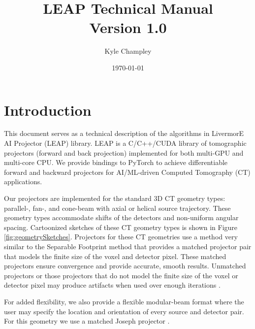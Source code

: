 \documentclass[11pt]{article}
\title{LEAP Technical Manual \\ Version 1.0}
\author{Kyle Champley}
\date{\today}
\begin{document}
\newcommand{\B}[1]{\textbf{#1}}
\newcommand{\ra}{\rightarrow}
\newcommand{\sinc}{\text{sinc}}
\newcommand{\supp}{\text{supp}}
\newcommand{\suppe}{\text{supp}_{\varepsilon}}
\newcommand{\ind}{\B{1}}
\newcommand{\sgn}{\text{sgn}}
\newcommand{\etal}{\text{et al. }}
\newcommand{\Beta}{{\boldsymbol\beta}}
\newcommand{\Radon}{\mathcal{R}}
\newcommand{\Xray}{\mathcal{P}}
\newcommand{\Fourier}{\mathcal{F}}
\newcommand{\Hilbert}{\mathcal{H}}
\newcommand{\Identity}{\mathcal{I}}
\newcommand{\BL}{\mathcal{L}}
\newcommand{\R}{\mathcal{R}}
\newcommand{\Cov}{\text{Cov}}
\newcommand{\argmin}{\operatorname{argmin}}

\maketitle



\section{Introduction}

This document serves as a technical description of the algorithms in LivermorE AI Projector (LEAP) library.  LEAP is a C/C++/CUDA library of tomographic projectors (forward and back projection) implemented for both multi-GPU and multi-core CPU. We provide bindings to PyTorch to achieve differentiable forward and backward projectors for AI/ML-driven Computed Tomography (CT) applications.

Our projectors are implemented for the standard 3D CT geometry types: parallel-, fan-, and cone-beam with axial or helical source trajectory. These geometry types accommodate shifts of the detectors and non-uniform angular spacing. Cartoonized sketches of these CT geometry types is shown in Figure \ref{fig:geometrySketches}. Projectors for these CT geometries use a method very similar to the Separable Footprint method \cite{Long_TMI_2010} that provides a matched projector pair that models the finite size of the voxel and detector pixel. These matched projectors ensure convergence and provide accurate, smooth results. Unmatched projectors or those projectors that do not model the finite size of the voxel or detector pixel may produce artifacts when used over enough iterations \cite{DeManBasu_PMB_2004}.

For added flexibility, we also provide a flexible modular-beam format where the user may specify the location and orientation of every source and detector pair.  For this geometry we use a matched Joseph projector \cite{Joseph_TMI_1982}.
\end{document}
